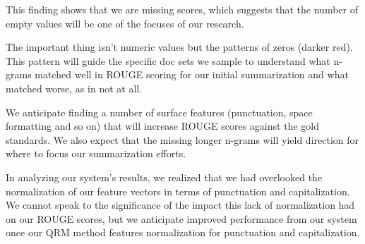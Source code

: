 \documentclass[11pt,a4paper]{article}
\begin{document}
This finding shows that we are missing scores, which suggests that the number of empty values will be one of the focuses of our research.

The important thing isn't numeric values but the patterns of zeros (darker red). This pattern will guide the specific doc sets we sample to understand what n-grams matched well in ROUGE scoring for our initial summarization and what matched worse, as in not at all.

We anticipate finding a number of surface features (punctuation, space formatting and so on) that will increase ROUGE scores against the gold standards. We also expect that the missing longer n-grams will yield direction for where to focus our summarization efforts.

In analyzing our system's results, we realized that we had overlooked the normalization of our feature vectors in terms of punctuation and capitalization. We cannot speak to the significance of the impact this lack of normalization had on our ROUGE scores, but we anticipate improved performance from our system once  our QRM method features normalization for punctuation and capitalization.






\end{document}
